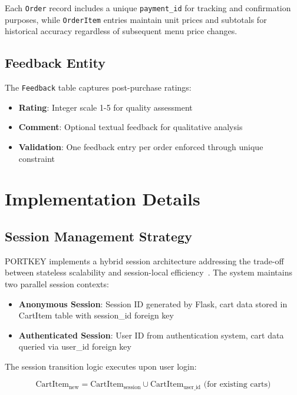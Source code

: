 \documentclass{ieeeaccess}
\begin{document}
Each \texttt{Order} record includes a unique \texttt{payment\_id} for tracking and confirmation purposes, while \texttt{OrderItem} entries maintain unit prices and subtotals for historical accuracy regardless of subsequent menu price changes.

\subsection{Feedback Entity}
The \texttt{Feedback} table captures post-purchase ratings:
\begin{itemize}
\item \textbf{Rating}: Integer scale 1-5 for quality assessment
\item \textbf{Comment}: Optional textual feedback for qualitative analysis
\item \textbf{Validation}: One feedback entry per order enforced through unique constraint
\end{itemize}

\section{Implementation Details}
\label{sec:impl}

\subsection{Session Management Strategy}
PORTKEY implements a hybrid session architecture addressing the trade-off between stateless scalability and session-local efficiency~\cite{b4}. The system maintains two parallel session contexts:

\begin{itemize}
\item \textbf{Anonymous Session}: Session ID generated by Flask, cart data stored in CartItem table with session\_id foreign key
\item \textbf{Authenticated Session}: User ID from authentication system, cart data queried via user\_id foreign key
\end{itemize}

The session transition logic executes upon user login:

\begin{equation}
\text{CartItem}_{\text{new}} = \text{CartItem}_{\text{session}} \cup \text{CartItem}_{\text{user\_id}} \text{ (for existing carts)}
\label{eq:cart_merge}
\end{equation}
\end{document}
